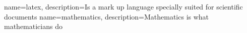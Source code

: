 {
        name=latex,
        description={Is a mark up language specially suited for 
scientific documents}
}
{
        name=mathematics,
        description={Mathematics is what mathematicians do}
}

